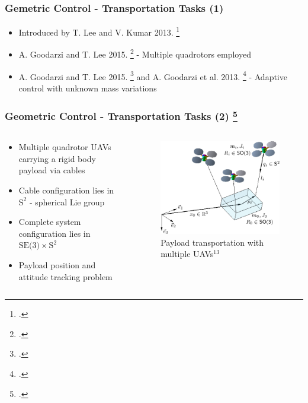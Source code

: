 \begin{frame}
	\frametitle{Gemetric Control - Transportation Tasks (1)}
	
	\begin{itemize}
		\item Introduced by T. Lee and V. Kumar 2013. \footcite{cable-load1}
		\item A. Goodarzi and T. Lee 2015. \footcite{cable-load-multiple} - Multiple quadrotors employed
		\item  A. Goodarzi and T. Lee 2015. \footcite{flexible-cable-dynamics} and A. Goodarzi et al. 2013. \footcite{stabilization-flexible-cable} - Adaptive control with unknown mass variations
	\end{itemize}
\end{frame}

\begin{frame}
	\frametitle{Geometric Control - Transportation Tasks (2) \footcite{Lee2014GeometricCO}}
	
	\begin{columns}
		\begin{column}{0.5\textwidth}\centering
			\begin{itemize}
				\item Multiple quadrotor UAVs carrying a rigid body payload via cables
				\item Cable configuration lies in $\text{S}^2$ - spherical Lie group
				\item Complete system configuration lies in $\text{SE(3)} \times \text{S}^2$
				\item Payload position and attitude tracking problem
			\end{itemize}
		\end{column}
		
		\begin{column}{0.5\textwidth}\centering
			\begin{figure}[H]
				\includegraphics[width=0.9\columnwidth]{figures/payload_carrying.png}
				\caption{Payload transportation with multiple UAVs${}^{13}$}
				\centering
			\end{figure}
		\end{column}
	\end{columns}
		
\end{frame}